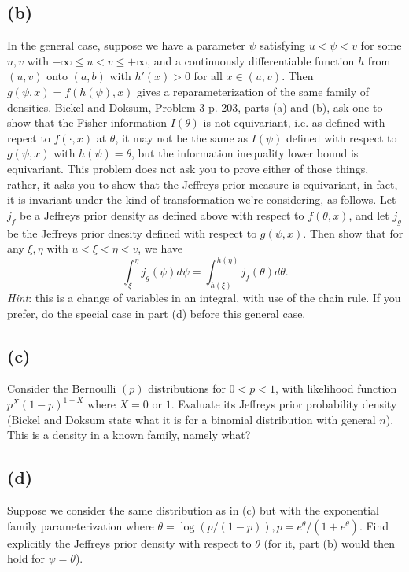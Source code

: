 \documentclass[11pt]{article}
\newcommand{\ProbS}{\iftrue}
\newcommand{\ProbE}{\fi}
\begin{document}
\subsection*{(b)}
\ProbS
In the general case, suppose we have a parameter $\psi$ satisfying
$u < \psi < v$ for some $u,v$ with $-\infty \leq u < v \leq +\infty$,
and a continuously differentiable function $h$ from $(u,v)$ onto $(a,b)$ with $h'(x)>0$ for all $x \in (u,v)$.
Then $g(\psi, x) = f(h(\psi), x)$ gives a reparameterization of the same family of densities.
Bickel and Doksum, Problem 3 p. 203, parts (a) and (b), ask one to show that the Fisher information $I(\theta)$ is not equivariant, i.e. as defined with repect to $f(\cdot, x)$ at $\theta$, it may not be the same as $I(\psi)$ defined with respect to $g(\psi, x)$ with $h(\psi)=\theta$, but the information inequality lower bound is equivariant.
This problem does not ask you to prove either of those things, rather, it asks you to show that the Jeffreys prior measure is equivariant, in fact, it is invariant under the kind of transformation we're considering, as follows.
Let $j_f$ be a Jeffreys prior density as defined above with respect to $f(\theta, x)$, and let $j_g$ be the Jeffreys prior dnesity defined with respect to $g(\psi, x)$. Then show that for any $\xi, \eta$ with $u < \xi < \eta < v$, we have
$$
\int_{\xi}^{\eta} j_g(\psi)d\psi = \int_{h(\xi)}^{h(\eta)} j_f(\theta) d\theta.
$$
\emph{Hint}: this is a change of variables in an integral, with use of the chain rule. If you prefer, do the special case in part (d) before this general case.
\ProbE

\subsection*{(c)}
\ProbS
Consider the Bernoulli $(p)$ distributions for $0<p<1$, with likelihood function $p^X(1-p)^{1-X}$ where $X=0$ or $1$. Evaluate its Jeffreys prior probability density (Bickel and Doksum state what it is for a binomial distribution with general $n$). This is a density in a known family, namely what?
\ProbE

\subsection*{(d)}
\ProbS
Suppose we consider the same distribution as in (c) but with the exponential family parameterization where $\theta = \log(p/(1-p)), p=e^{\theta}/(1+e^{\theta})$. Find explicitly the Jeffreys prior density with respect to $\theta$ (for it, part (b) would then hold for $\psi = \theta$).
\ProbE
\end{document}
